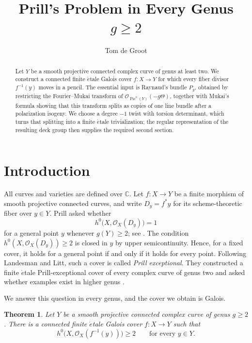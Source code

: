 \documentclass[a4paper]{amsart}
\title{Prill's Problem in Every Genus \(g\geq 2\)}
\author{Tom de Groot}
\date{}
\newtheorem{theorem}{Theorem}[section]
\theoremstyle{remark}
\DeclareMathOperator{\Pic}{Pic}
\newcommand{\OO}{\mathcal O}
\newcommand{\CC}{\mathbb C}
\begin{document}
\begin{abstract}
Let \(Y\) be a smooth projective connected complex curve of genus at least two.
We construct a connected finite \(\acute{e}\)tale Galois cover \(f:X\to Y\) for which every fiber divisor \(f^{-1}(y)\) moves in a pencil.
The essential input is Raynaud's bundle \(P_g\), obtained by restricting the Fourier--Mukai transform of \(\OO_{\Pic^0(Y)}(-g\Theta)\), together with Mukai's formula showing that this transform splits as copies of one line bundle after a polarization isogeny.
We choose a degree \(-1\) twist with torsion determinant, which turns that splitting into a finite \(\acute{e}\)tale trivialization; the regular representation of the resulting deck group then supplies the required second section.
\end{abstract}

\maketitle

\section{Introduction}

All curves and varieties are defined over \(\CC\).  Let \(f:X\to Y\) be a finite morphism of smooth projective connected curves, and write \(D_y=f^*y\) for its scheme-theoretic fiber over \(y\in Y\).  Prill asked whether
\[
 h^0\bigl(X,\OO_X(D_y)\bigr)=1
\]
for a general point \(y\) whenever \(g(Y)\geq 2\); see \cite[Chapter VI, Exercise D]{ACGH}.  The condition \(h^0(X,\OO_X(D_y))\geq 2\) is closed in \(y\) by upper semicontinuity.  Hence, for a fixed cover, it holds for a general point if and only if it holds for every point.  Following Landesman and Litt, such a cover is called \emph{Prill exceptional}.  They constructed a finite \(\acute{e}\)tale Prill-exceptional cover of every complex curve of genus two and asked whether examples exist in higher genus \cite[Theorem 1.2 and Remark 1.4]{LandesmanLitt}.

We answer this question in every genus, and the cover we obtain is Galois.

\begin{theorem}\label{thm:main}
Let \(Y\) be a smooth projective connected complex curve of genus \(g\geq 2\).  There is a connected finite \(\acute{e}\)tale Galois cover \(f:X\to Y\) such that
\[
 h^0\bigl(X,\OO_X(f^{-1}(y))\bigr)\geq 2
 \qquad\text{for every }y\in Y.
\]
\end{theorem}
\end{document}

